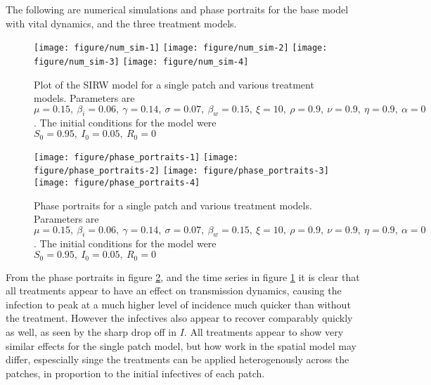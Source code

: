 \documentclass[12pt]{article}\usepackage[]{graphicx}\usepackage[]{color}
\newenvironment{knitrout}{}{} %
\begin{document}
The following are numerical simulations and phase portraits for the base model with vital dynamics, and the three treatment models.



\begin{knitrout}
\color{fgcolor}\begin{figure}

{\centering \texttt{[image: figure/num\_sim-1]} 
\texttt{[image: figure/num\_sim-2]} 
\texttt{[image: figure/num\_sim-3]} 
\texttt{[image: figure/num\_sim-4]} 

}

\caption{\label{fig:num.sim} Plot of the SIRW model for a single patch and various treatment models. Parameters are $\mu=0.15,\ \beta_i=0.06,\ \gamma=0.14,\ \sigma=0.07,\ \beta_w=0.15,\ \xi=10,\ \rho=0.9,\ \nu=0.9,\ \eta=0.9,\ \alpha=0$. The initial conditions for the model were $S_0=0.95,\ I_0=0.05,\ R_0=0$}\label{fig:num.sim}
\end{figure}


\end{knitrout}

\begin{knitrout}
\color{fgcolor}\begin{figure}

{\centering \texttt{[image: figure/phase\_portraits-1]} 
\texttt{[image: figure/phase\_portraits-2]} 
\texttt{[image: figure/phase\_portraits-3]} 
\texttt{[image: figure/phase\_portraits-4]} 

}

\caption{\label{fig:phase.portraits} Phase portraits for a single patch and various treatment models. Parameters are $\mu=0.15,\ \beta_i=0.06,\ \gamma=0.14,\ \sigma=0.07,\ \beta_w=0.15,\ \xi=10,\ \rho=0.9,\ \nu=0.9,\ \eta=0.9,\ \alpha=0$. The initial conditions for the model were $S_0=0.95,\ I_0=0.05,\ R_0=0$}\label{fig:phase.portraits}
\end{figure}


\end{knitrout}

\FloatBarrier

From the phase portraits in figure \ref{fig:phase.portraits}, and the time series in figure \ref{fig:num.sim} it is clear that all treatments appear to have an effect on transmission dynamics, causing the infection to peak at a much higher level of incidence much quicker than without the treatment.
However the infectives also appear to recover comparably quickly as well, as seen by the sharp drop off in $I$.
All treatments appear to show very similar effects for the single patch model, but how work in the spatial model may differ, espescially singe the treatments can be applied heterogenously across the patches, in proportion to the initial infectives of each patch.
\end{document}
